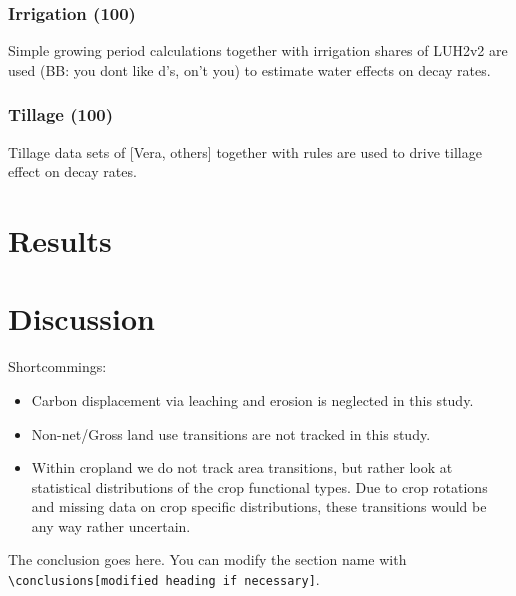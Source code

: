 \documentclass[gc, manuscript]{copernicus}
\begin{document}
\subsubsection{Irrigation (100)}

Simple growing period calculations together with irrigation shares of
LUH2v2 are used (BB: you dont like d's, on't you) to estimate water
effects on decay rates.

\subsubsection{Tillage (100)}

Tillage data sets of {[}Vera, others{]} together with rules are used to
drive tillage effect on decay rates. \newpage

\section{Results}

\newpage

\section{Discussion}

Shortcommings:

\begin{itemize}
\item
  Carbon displacement via leaching and erosion is neglected in this
  study.
\item
  Non-net/Gross land use transitions are not tracked in this study.
\item
  Within cropland we do not track area transitions, but rather look at
  statistical distributions of the crop functional types. Due to crop
  rotations and missing data on crop specific distributions, these
  transitions would be any way rather uncertain. \newpage
\end{itemize}

\conclusions

The conclusion goes here. You can modify the section name with
\texttt{\textbackslash{}conclusions{[}modified\ heading\ if\ necessary{]}}.
\newpage




\end{document}
